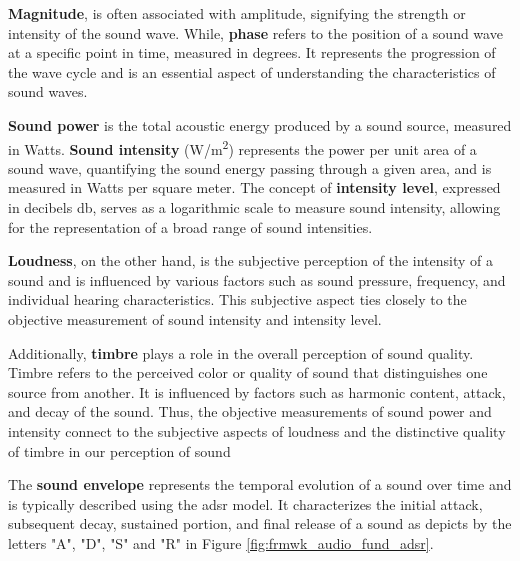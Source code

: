\textbf{Magnitude}, is often associated with amplitude, signifying the strength or intensity of the sound wave. While, \textbf{phase} refers to the position of a sound wave at a specific point in time, measured in degrees. It represents the progression of the wave cycle and is an essential aspect of understanding the characteristics of sound waves.

\textbf{Sound power} is the total acoustic energy produced by a sound source, measured in Watts. \textbf{Sound intensity} (W/m\textsuperscript{2}) represents the power per unit area of a sound wave, quantifying the sound energy passing through a given area, and is measured in Watts per square meter. The concept of \textbf{intensity level}, expressed in decibels \gls{db}, serves as a logarithmic scale to measure sound intensity, allowing for the representation of a broad range of sound intensities.

\textbf{Loudness}, on the other hand, is the subjective perception of the intensity of a sound and is influenced by various factors such as sound pressure, frequency, and individual hearing characteristics. This subjective aspect ties closely to the objective measurement of sound intensity and intensity level.

Additionally, \textbf{timbre} plays a role in the overall perception of sound quality. Timbre refers to the perceived color or quality of sound that distinguishes one source from another. It is influenced by factors such as harmonic content, attack, and decay of the sound. Thus, the objective measurements of sound power and intensity connect to the subjective aspects of loudness and the distinctive quality of timbre in our perception of sound

The \textbf{sound envelope} represents the temporal evolution of a sound over time and is typically described using the \gls{adsr} model. It characterizes the initial attack, subsequent decay, sustained portion, and final release of a sound as depicts by the letters "A", "D", "S" and "R" in Figure \ref{fig:frmwk_audio_fund_adsr}.


